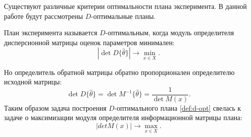 Существуют различные критерии оптимальности плана эксперимента. В данной работе будут рассмотрены $D$-оптимальные планы.

\begin{definition}
	План эксперимента называется $D$-оптимальным, когда модуль определителя дисперсионной матрицы оценок параметров минимален:
	\begin{equation}\label{def:d-opt}
	|\det D\{\hat \theta\} | \rightarrow \min_{x \in X}.
	\end{equation}
\end{definition}

Но определитель обратной матрицы обратно пропорционален определителю исходной матрицы:
\begin{equation*}
\det {D\{\hat \theta\}} = \det {M^{-1}\{\hat \theta\}} = \frac 1 {\det M(x)}.
\end{equation*}
Таким образом задача построения $D$-оптимального плана \ref{def:d-opt} свелась к задаче о максимизации модуля определителя информационной матрицы плана:
\begin{equation}
|det M(x)| \rightarrow \max_{x \in X}.
\end{equation}
 